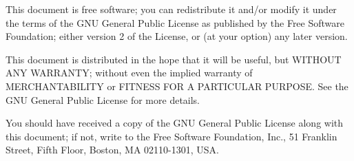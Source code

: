 \documentclass[a4paper,10pt]{book}
\newcommand{\ind}[1]{\begin{latexonly}\index{#1}\end{latexonly}}
\newcommand{\bracehack}{\def\{{\char"7B}\def\}{\char"7D}}
\newcommand{\titem}[1]{\item[\bracehack\texttt{#1}]}
\newcommand{\Jabber}{Jabber}
\begin{document}
This document is free software; you can redistribute it and/or
modify it under the terms of the GNU General Public License
as published by the Free Software Foundation; either version 2
of the License, or (at your option) any later version.

This document is distributed in the hope that it will be useful,
but WITHOUT ANY WARRANTY; without even the implied warranty of
MERCHANTABILITY or FITNESS FOR A PARTICULAR PURPOSE. See the
GNU General Public License for more details.

You should have received a copy of the GNU General Public License along with
this document; if not, write to the Free Software Foundation, Inc., 51 Franklin
Street, Fifth Floor, Boston, MA 02110-1301, USA.






\begin{latexonly}
\printindex
\end{latexonly}
\end{document}
